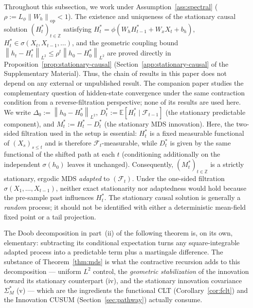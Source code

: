 \documentclass[bj,authoryear]{imsart}
\theoremstyle{plain}
\theoremstyle{definition}
\newcommand{\E}{\mathbb{E}}
\newcommand{\F}{\mathcal{F}}
\newcommand{\norm}[1]{\left\lVert #1 \right\rVert}
\newcommand{\given}{\mid}
\begin{document}
{
Throughout this subsection, we work under Assumption~\ref{ass:spectral}
($\rho:=L_\phi\norm{W_h}_{\mathrm{op}}<1$).
The existence and uniqueness of the stationary causal solution
$(H_t^*)_{t\in\mathbb{Z}}$ satisfying
$H_t^*=\phi(W_hH_{t-1}^*+W_xX_t+b_h)$,
$H_t^*\in\sigma(X_t,X_{t-1},\ldots)$,
and the geometric coupling bound
$\norm{h_t-H_t^*}_{L^2}\leq\rho^t\norm{h_0-H_0^*}_{L^2}$
are proved directly in Proposition~\ref{prop:stationary-causal}
(Section~\ref{app:stationary-causal} of the Supplementary Material).
Thus, the chain of results in this paper does not depend on any external
or unpublished result.
The companion paper \citet{chang2026backward} studies the complementary
question of hidden-state convergence under the same contraction condition
from a reverse-filtration perspective; none of its results are used here.
We write $\Delta_0:=\norm{h_0-H_0^*}_{L^2}$,
$D_t^*:=\E[H_t^*\given\F_{t-1}]$ (the stationary predictable component),
and $M_t^*:=H_t^*-D_t^*$ (the stationary MDS innovation).
Here, the two-sided filtration used in the setup is essential:
$H_t^*$ is a fixed measurable functional of $(X_s)_{s\leq t}$ and is
therefore $\F_t$-measurable, while $D_t^*$ is given by the same functional
of the shifted path at each $t$ (conditioning additionally on the independent
$\sigma(h_0)$ leaves it unchanged). Consequently,
$(M_t^*)_{t\in\mathbb{Z}}$ is a strictly stationary, ergodic MDS
\emph{adapted} to $(\F_t)$. Under the one-sided filtration
$\sigma(X_1,\ldots,X_{t-1})$, neither exact stationarity nor adaptedness
would hold because the pre-sample past influences $H_t^*$.
The stationary causal solution is generally a \emph{random} process;
it should not be identified with either a deterministic mean-field fixed
point or a tail projection.
}

The Doob decomposition in part~(ii) of the following theorem is, on its
own, elementary: subtracting its conditional expectation turns any
square-integrable adapted process into a predictable term plus a
martingale difference.  The substance of Theorem~\ref{thm:mds} is what the
contractive recursion adds to this decomposition --- uniform $L^2$ control,
the \emph{geometric stabilization} of the innovation toward its stationary
counterpart (iv), and the stationary innovation covariance $\Sigma_M^*$
(v) --- which are the ingredients the functional CLT
(Corollary~\ref{cor:fclt}) and the Innovation CUSUM
(Section~\ref{sec:pathway}) actually consume.
\end{document}
